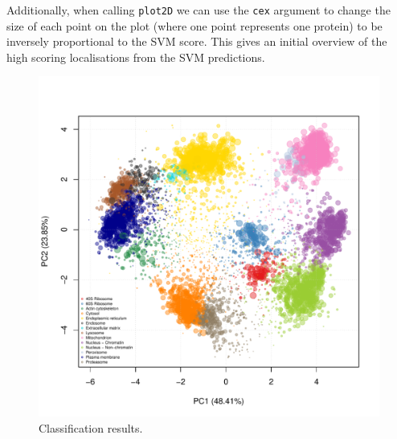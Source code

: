 Additionally, when calling \texttt{plot2D} we can use the \texttt{cex}
argument to change the size of each point on the plot (where one point
represents one protein) to be inversely proportional to the SVM
score. This gives an initial overview of the high scoring
localisations from the SVM predictions.



\begin{figure}[!ht]
  \centering
\begin{knitrout}
\color{fgcolor}\begin{kframe}
\begin{alltt}
 \hlkwb{<-} \hlstd{(}\hlopt{$} \hlopt{-} 
  \hlstd{=} \hlstd{,}  
  \hlstd{=} \hlstd{,}  \hlstd{=} \hlstd{,}  \hlstd{=} \hlstd{,}  \hlstd{=} \hlstd{)}
\end{alltt}
\end{kframe}
\includegraphics[width=.8\textwidth]{figure/plotSVM-1} 

\end{knitrout}
  \caption{Classification results.}
  \label{fig:plotSVM}
\end{figure}



